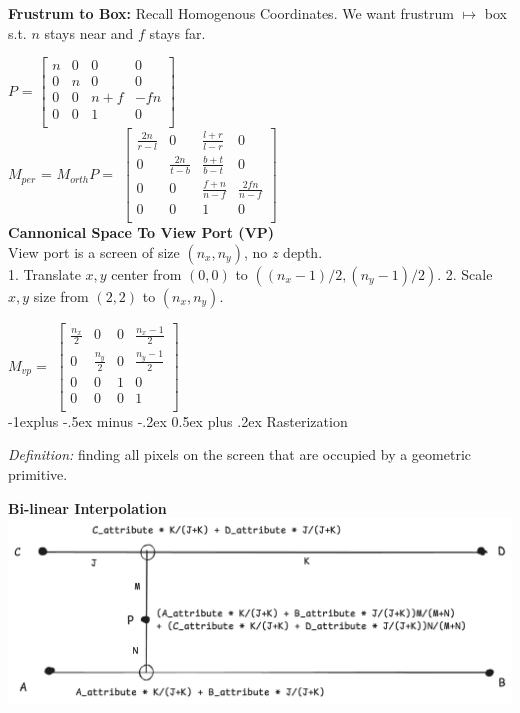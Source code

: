 \documentclass[letterpaper, 8pt]{extarticle}
\makeatletter
\renewcommand{\section}{\@startsection{section}{1}{0mm}%
                                {-1explus -.5ex minus -.2ex}%
                                {0.5ex plus .2ex}%
                                {\normalfont\normalsize\bfseries}}
\makeatother
\begin{document}
\begin{multicols*}{4}
\textbf{Frustrum to Box:}
Recall Homogenous Coordinates. We want frustrum $\mapsto$ box s.t. $n$ stays near and $f$ stays far.

$P$ = 
\(
\begin{bmatrix}
    n & 0 & 0 & 0 \\
    0 & n & 0 & 0 \\
    0 & 0 & n+f & -fn \\
    0 & 0 & 1 & 0 \\
\end{bmatrix}
\)\\
$M_{per}$ = $M_{orth}P =$
\(
\begin{bmatrix}
    \frac{2n}{r-l} & 0 & \frac{l+r}{l-r} & 0 \\
    0 & \frac{2n}{t-b} & \frac{b+t}{b-t} & 0 \\
    0 & 0 & \frac{f+n}{n-f} & \frac{2fn}{n-f} \\
    0 & 0 & 1 & 0 \\
\end{bmatrix}
\)\\

\textbf{Cannonical Space To View Port (VP)}\\

View port is a screen of size $(n_x, n_y)$, no $z$ depth.\\
1. Translate $x,y$ center from $(0,0)$ to $((n_x-1)/2, (n_y-1)/2)$. 
2. Scale $x,y$ size from $(2,2)$ to $(n_x, n_y)$.

$M_{vp} = $
\(
\begin{bmatrix}
    \frac{n_x}{2} & 0 & 0 & \frac{n_x-1}{2} \\
    0 & \frac{n_y}{2} & 0 & \frac{n_y-1}{2} \\
    0 & 0 & 1 & 0 \\
    0 & 0 & 0 & 1 \\
\end{bmatrix}
\)\\



\section{Rasterization}

\textit{Definition:} finding all pixels on the screen that are occupied by a geometric primitive.

\textbf{Bi-linear Interpolation}
\includegraphics[width=\linewidth]{bilinear-interpolation.png}


\end{multicols*}
\end{document}
